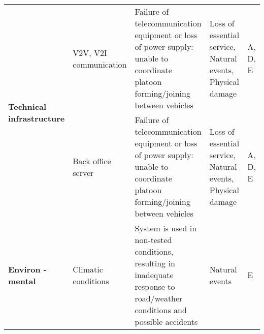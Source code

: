 \documentclass[british,11pt,a4paper]{article}
\begin{document}
\begin{longtable}{|p{2cm}|p{1.5cm}|p{8cm}|p{3cm}|p{1.2cm}|}
\multirow{2}{2cm}{\textbf{Technical infrastructure}} & V2V, V2I communication & Failure of telecommunication equipment or loss of power supply: unable to coordinate platoon forming/joining between vehicles & Loss of essential service, Natural events, Physical damage & A, D, E \\ \cline{2-5}
 & Back office server & Failure of telecommunication equipment or loss of power supply: unable to coordinate platoon forming/joining between vehicles & Loss of essential service, Natural events, Physical damage & A, D, E \\ \hline
\textbf{Environ - mental} & Climatic conditions & System is used in non-tested conditions, resulting in inadequate response to road/weather conditions and possible accidents & Natural events & E \\ \hline

\end{longtable}
\label{tab:threats}
\end{document}
